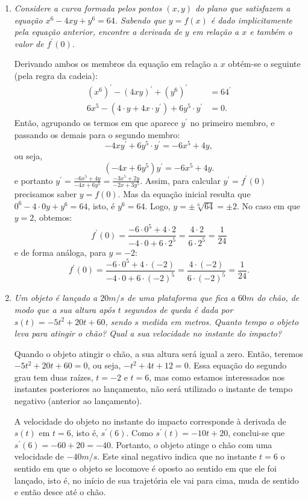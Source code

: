 \documentclass[12pt,a4paper]{article}
\begin{document}
\begin{enumerate}
\item \textit{ Considere a curva formada pelos pontos $(x,y)$ do plano que satisfazem a equação $x^6 - 4x y + y^6 = 64$. Sabendo que $y = f(x)$ é dado implicitamente pela equação anterior, encontre a derivada de $y$ em relação a $x$ e também o valor de $f^\prime(0)$. }

Derivando ambos os membros da equação em relação a $x$ obtém-se o seguinte (pela regra da cadeia):
\begin{align*}
(x^6)^\prime - (4x y)^\prime + (y^6)^\prime & = 64^\prime \\
6x^5 - (4 \cdot y + 4x \cdot y^\prime ) + 6y^5 \cdot y^\prime & = 0.
\end{align*}
Então, agrupando os termos em que aparece $y^\prime$ no primeiro membro, e passando os demais para o segundo membro:
\[
-4xy^\prime + 6y^5 \cdot y^\prime
= -6x^5 + 4 y,
\]
ou seja,
\[
(-4x + 6y^5)y^\prime
= -6x^5 + 4 y.
\]
e portanto $y^\prime = \frac{-6x^5 + 4 y}{-4x + 6y^5}
= \frac{-3x^5 + 2 y}{-2x + 3y^5}$. Assim, para calcular $y^\prime = f^\prime(0)$ precisamos saber $y = f(0)$. Mas da equação inicial resulta que $0^6 - 4 \cdot 0 y + y^6 = 64$, isto, é $y^6 = 64$. Logo, $y = \pm \sqrt[6]{64} = \pm 2$. No caso em que $y=2$, obtemos:
\[
f^\prime(0)
= \frac{-6 \cdot 0^5 + 4 \cdot 2}{-4 \cdot 0 + 6\cdot 2^5}
= \frac{4 \cdot 2}{6\cdot 2^5}
= \frac{1}{24}
\]
e de forma análoga, para $y=-2$:
\[
f^\prime(0)
= \frac{-6 \cdot 0^5 + 4 \cdot (- 2)}{-4 \cdot 0 + 6\cdot (- 2)^5}
= \frac{4 \cdot (- 2)}{6\cdot (- 2)^5}
= \frac{1}{24}.
\]

\item \textit{ Um objeto é lançado a $20m/s$ de uma plataforma que fica a $60 m$ do chão, de modo que a sua altura após $t$ segundos de queda é dada por $s(t) = -5t^2 + 20t + 60$, sendo $s$ medida em metros. Quanto tempo o objeto leva para atingir o chão? Qual a sua velocidade no instante do impacto? }

Quando o objeto atingir o chão, a sua altura será igual a zero. Então, teremos $-5t^2 + 20t + 60 = 0$, ou seja, $-t^2 + 4t + 12 = 0$. Essa equação do segundo grau tem duas raízes, $t=-2$ e $t=6$, mas como estamos interessados nos instantes posteriores ao lançamento, não será utilizado o instante de tempo negativo (anterior ao lançamento).

A velocidade do objeto no instante do impacto corresponde à derivada de $s(t)$ em $t=6$, isto é, $s^\prime(6)$. Como $s^\prime(t) = -10 t + 20$, conclui-se que $s^\prime(6) = -60 + 20 = -40$. Portanto, o objeto atinge o chão com uma velocidade de $-40m/s$. Este sinal negativo indica que no instante $t=6$ o sentido em que o objeto se locomove é oposto ao sentido em que ele foi lançado, isto é, no início de sua trajetória ele vai para cima, muda de sentido e então desce até o chão.
\end{enumerate}
\end{document}
